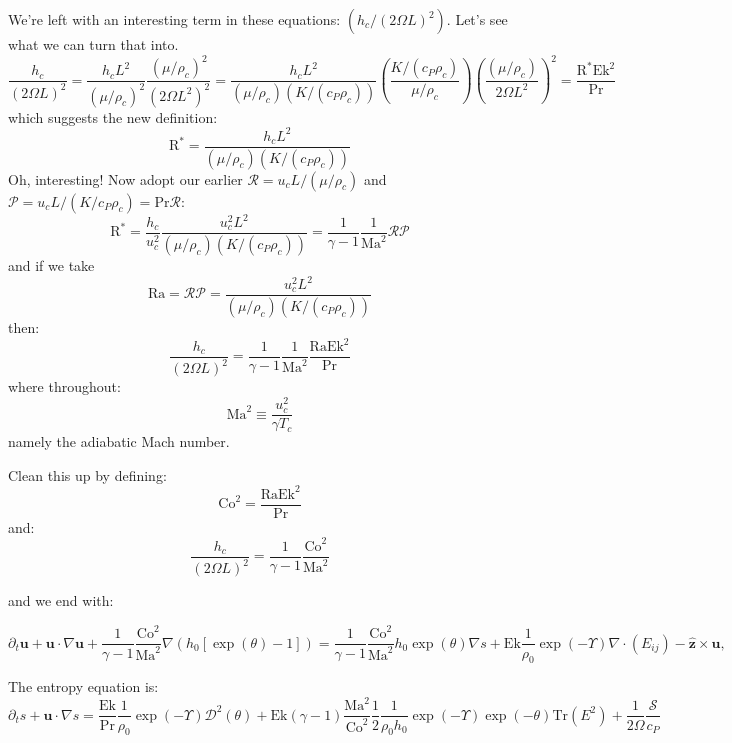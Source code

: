 \documentclass{aastex62}
\newcommand{\del}{\nabla}
\renewcommand{\vec}{\boldsymbol}
\newcommand{\scrR}{\mathcal{R}}
\newcommand{\scrP}{\mathcal{P}}
\begin{document}
We're left with an interesting term in these equations: $\left(h_c/(2\Omega L)^2\right)$.  Let's see what we can turn that into.
\begin{equation}
\frac{h_c}{(2\Omega L)^2}
= \frac{h_c L^2}{(\mu/\rho_c)^2} \frac{(\mu/\rho_c)^2}{(2\Omega L^2)^2}
= \frac{h_c L^2}{(\mu/\rho_c)(K/(c_P \rho_c))}\left(\frac{K/(c_P \rho_c)}{\mu/\rho_c}\right) \left(\frac{(\mu/\rho_c)}{2\Omega L^2}\right)^2
= \frac{\mathrm{R}^* \mathrm{Ek}^2}{\mathrm{Pr}}
\end{equation}
which suggests the new definition:
\begin{equation}
\mathrm{R}^* = \frac{h_c L^2}{(\mu/\rho_c)(K/(c_P \rho_c))}
\end{equation}
Oh, interesting!  Now adopt our earlier $\scrR = u_c L/(\mu/\rho_c)$ and $\scrP = u_c L/(K/c_P \rho_c) = \mathrm{Pr}\scrR$:
\begin{equation}
\mathrm{R}^* = \frac{h_c}{u_c^2}\frac{u_c^2 L^2}{(\mu/\rho_c)(K/(c_P \rho_c))} = \frac{1}{\gamma-1}\frac{1}{\mathrm{Ma}^{2}} \scrR \scrP
\end{equation}
and if we take
\begin{equation}
  \mathrm{Ra} = \scrR \scrP = \frac{u_c^2 L^2}{(\mu/\rho_c)(K/(c_P \rho_c))}
\end{equation}
then:
\begin{equation}
  \frac{h_c}{(2\Omega L)^2} = \frac{1}{\gamma-1}\frac{1}{\mathrm{Ma}^{2}}\frac{\mathrm{Ra}\mathrm{Ek}^2}{\mathrm{Pr}}
\end{equation}
where throughout:
\begin{equation}
  \mathrm{Ma}^{2} \equiv \frac{u_c^2}{\gamma T_c}
\end{equation}
namely the adiabatic Mach number.

Clean this up by defining:
\begin{equation}
  \mathrm{Co}^2 = \frac{\mathrm{Ra}\mathrm{Ek}^2}{\mathrm{Pr}}
\end{equation}
and:
\begin{equation}
  \frac{h_c}{(2\Omega L)^2} = \frac{1}{\gamma-1}\frac{\mathrm{Co}^2}{\mathrm{Ma}^{2}}
\end{equation}

and we end with:

\begin{equation}
  \partial_t \vec{u} + \vec{u}\cdot \del \vec{u} + \frac{1}{\gamma-1}\frac{\mathrm{Co}^2}{\mathrm{Ma}^{2}}\del (h_0[\exp(\theta)-1]) =
  \frac{1}{\gamma-1}\frac{\mathrm{Co}^2}{\mathrm{Ma}^{2}} h_0\exp(\theta)\del s
  + \mathrm{Ek}\frac{1}{\rho_0}\exp(-\Upsilon)\del\cdot (E_{ij}) - \vec{\hat{z}} \times \vec{u},
\end{equation}

The entropy equation is:
\begin{equation}
  \partial_t s + \vec{u}\cdot \del s =
  \frac{\mathrm{Ek}}{\mathrm{Pr}} \frac{1}{\rho_0} \exp(-\Upsilon)\mathcal{D}^2(\theta)
  + \mathrm{Ek} (\gamma-1)\frac{\mathrm{Ma}^{2}}{\mathrm{Co}^2} \frac{1}{2}\frac{1}{\rho_0 h_0}\exp(-\Upsilon) \exp(-\theta)\mathrm{Tr}(E^2)
  + \frac{1}{2 \Omega} \frac{\mathcal{S}}{c_P}
\end{equation}
\end{document}
